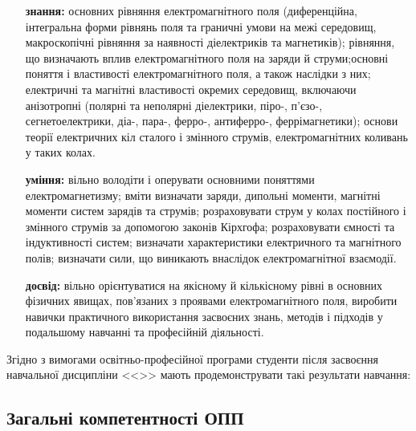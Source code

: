 \documentclass{Syllabus}
\begin{document}
\begin{enumerate}
	\item[\bfseries знання:] основних рівняння електромагнітного поля (диференційна, інтегральна форми рівнянь поля та граничні умови на межі середовищ, макроскопічні рівняння за наявності діелектриків та магнетиків); рівняння, що визначають вплив електромагнітного поля на заряди й струми;основні поняття і властивості електромагнітного поля, а також наслідки з них; електричні та магнітні властивості окремих середовищ, включаючи анізотропні (полярні та неполярні діелектрики, піро-, п’єзо-, сегнетоелектрики, діа-, пара-, ферро-, антиферро-, феррімагнетики);	основи теорії електричних кіл сталого і змінного струмів, електромагнітних коливань у таких колах.
	\item[\bfseries уміння:] вільно володіти і оперувати основними поняттями електромагнетизму; вміти визначати заряди, дипольні моменти, магнітні моменти систем зарядів та струмів; розраховувати струм у колах постійного і змінного струмів за допомогою законів Кірхгофа; розраховувати ємності та індуктивності систем; визначати характеристики електричного та магнітного полів; визначати сили, що виникають внаслідок електромагнітної взаємодії.
	\item[\bfseries досвід:] вільно орієнтуватися на якісному й кількісному рівні в основних фізичних явищах, пов’язаних з проявами електромагнітного поля, виробити навички практичного використання засвоєних знань, методів і підходів у подальшому навчанні та професійній діяльності.
\end{enumerate}

Згідно з вимогами освітньо-професійної програми
студенти після засвоєння навчальної дисципліни <<\discipline>> мають продемонструвати такі результати навчання:

\subsection*{Загальні компетентності ОПП}
\end{document}
